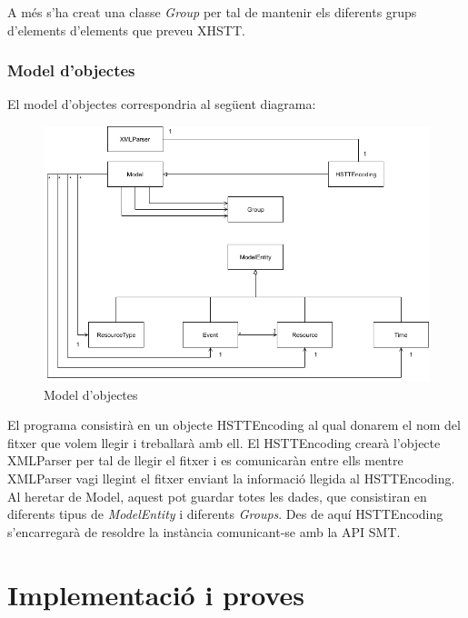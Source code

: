 \documentclass[11pt,a4paper,twoside]{report}
\begin{document}
  A més s'ha creat una classe \textit{Group} per tal de mantenir els diferents grups d'elements d'elements que preveu XHSTT.  


  \subsection{Model d'objectes}

  El model d'objectes correspondria al següent diagrama:
  \begin{figure}[H]
    \includegraphics[width=\textwidth]{Diagrames/UMLKai.png}
    \caption{Model d'objectes}
    \label{fig:ObjectModel}
  \end{figure}
  

  El programa consistirà en un objecte HSTTEncoding al qual donarem el nom del fitxer que volem llegir i treballarà amb ell. 
  El HSTTEncoding crearà l'objecte XMLParser per tal de llegir el fitxer i es comunicaràn entre ells mentre XMLParser vagi llegint el fitxer enviant la informació llegida al HSTTEncoding. 
  Al heretar de Model, aquest pot guardar totes les dades, que consistiran en diferents tipus de \textit{ModelEntity} i diferents \textit{Groups}.
  Des de aquí HSTTEncoding s'encarregarà de resoldre la instància comunicant-se amb la API SMT.


  

  \chapter{Implementació i proves}
\end{document}
